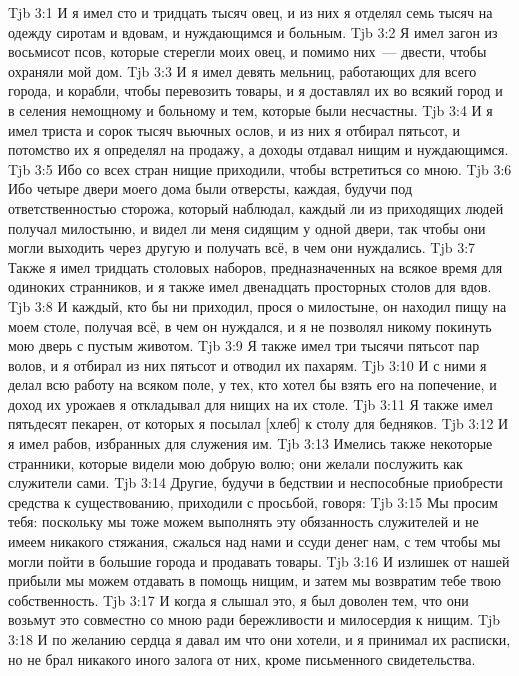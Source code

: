 \vs Tjb 3:1
И я имел сто и тридцать тысяч овец, и из них я отделял семь тысяч на одежду сиротам и вдовам, и нуждающимся и больным.
\vs Tjb 3:2
Я имел загон из восьмисот псов, которые стерегли моих овец, и помимо них~--- двести, чтобы охраняли мой дом.
\vs Tjb 3:3
И я имел девять мельниц, работающих для всего города, и корабли, чтобы перевозить товары, и я доставлял их во всякий город и в селения немощному и больному и тем, которые были несчастны.
\vs Tjb 3:4
И я имел триста и сорок тысяч вьючных ослов, и из них я отбирал пятьсот, и потомство их я определял на продажу, а доходы отдавал нищим и нуждающимся.
\vs Tjb 3:5
Ибо со всех стран нищие приходили, чтобы встретиться со мною.
\vs Tjb 3:6
Ибо четыре двери моего дома были отверсты, каждая, будучи под ответственностью сторожа, который наблюдал, каждый ли из приходящих людей получал милостыню, и видел ли меня сидящим у одной двери, так чтобы они могли выходить через другую и получать всё, в чем они нуждались.
\vs Tjb 3:7
Также я имел тридцать столовых наборов, предназначенных на всякое время для одиноких странников, и я также имел двенадцать просторных столов для вдов.
\vs Tjb 3:8
И каждый, кто бы ни приходил, прося о милостыне, он находил пищу на моем столе, получая всё, в чем он нуждался, и я не позволял никому покинуть мою дверь с пустым животом.
\vs Tjb 3:9
Я также имел три тысячи пятьсот пар волов, и я отбирал из них пятьсот и отводил их пахарям.
\vs Tjb 3:10
И с ними я делал всю работу на всяком поле, у тех, кто хотел бы взять его на попечение, и доход их урожаев я откладывал для нищих на их столе.
\vs Tjb 3:11
Я также имел пятьдесят пекарен, от которых я посылал [хлеб] к столу для бедняков.
\vs Tjb 3:12
И я имел рабов, избранных для служения им.
\vs Tjb 3:13
Имелись также некоторые странники, которые видели мою добрую волю; они желали послужить как служители сами.
\vs Tjb 3:14
Другие, будучи в бедствии и неспособные приобрести средства к существованию, приходили с просьбой, говоря:
\vs Tjb 3:15
Мы просим тебя: поскольку мы тоже можем выполнять эту обязанность служителей и не имеем никакого стяжания, сжалься над нами и ссуди денег нам, с тем чтобы мы могли пойти в большие города и продавать товары.
\vs Tjb 3:16
И излишек от нашей прибыли мы можем отдавать в помощь нищим, и затем мы возвратим тебе твою собственность.
\vs Tjb 3:17
И когда я слышал это, я был доволен тем, что они возьмут это совместно со мною ради бережливости и милосердия к нищим.
\vs Tjb 3:18
И по желанию сердца я давал им что они хотели, и я принимал их расписки, но не брал никакого иного залога от них, кроме письменного свидетельства.
